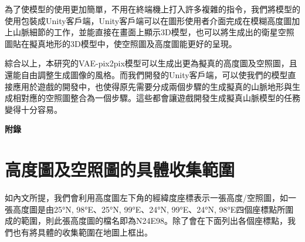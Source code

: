 \documentclass[a4paper, 12pt]{article}
\begin{document}
為了使模型的使用更加簡單，不用在終端機上打入許多複雜的指令，我們將模型的使用包裝成Unity客戶端，Unity客戶端可以在圖形使用者介面完成在模糊高度圖加上山脈細節的工作，並能直接在畫面上顯示3D模型，也可以將生成出的衛星空照圖貼在擬真地形的3D模型中，使空照圖及高度圖能更好的呈現。

綜合以上，本研究的VAE-pix2pix模型可以生成出更為擬真的高度圖及空照圖，且還能自由調整生成圖像的風格。而我們開發的Unity客戶端，可以使我們的模型直接應用於遊戲的開發中，也使得原先需要分成兩個步驟的生成擬真的山脈地形與生成相對應的空照圖整合為一個步驟。這些都會讓遊戲開發生成擬真山脈模型的任務變得十分容易。


\nocite{*}
\printbibliography[title={參考文獻}]



\newpage
\begin{appendices}
    \setcounter{page}{1}
    \textbf{\LARGE 附錄}

    \section{高度圖及空照圖的具體收集範圍}
    如內文所提，我們會利用高度圖左下角的經緯度座標表示一張高度/空照圖，如一張高度圖是由25°N, 98°E、25°N, 99°E、24°N, 99°E、24°N, 98°E四個座標點所圍成的範圍，則此張高度圖的檔名即為N24E98。除了會在下面列出各個座標點，我們也有將具體的收集範圍在地圖上框出。


\end{appendices}
\end{document}
